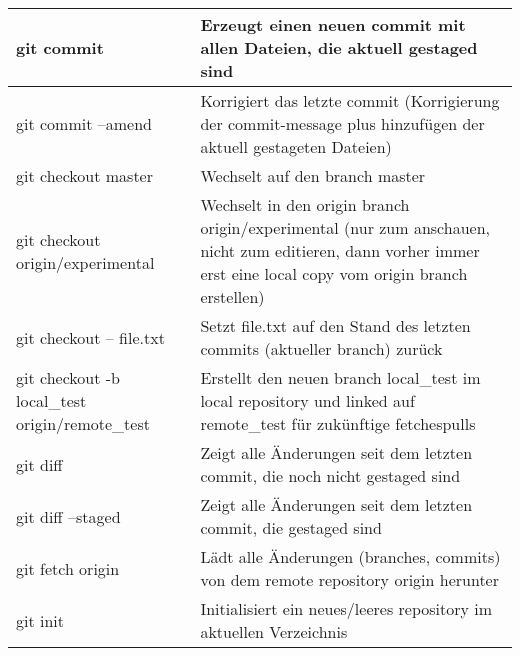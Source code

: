 \begin{longtable}{|p{7cm}|p{8cm}|}
		  	\rowcolor{tablerowcolor_orange}
		  	git commit & Erzeugt einen neuen commit mit allen Dateien, die aktuell gestaged sind
		  	\\ \hline
		  	\rowcolor{tablerowcolor_orange}
		  	git commit --amend & Korrigiert das letzte commit (Korrigierung der commit-message plus hinzufügen der aktuell gestageten Dateien)
		  	\\ \hline


		  	\rowcolor{tablerowcolor_cyan}
		  	git checkout master & Wechselt auf den branch master
		  	\\ \hline
		  	\rowcolor{tablerowcolor_cyan}
		  	git checkout origin/experimental & Wechselt in den origin branch origin/experimental (nur zum anschauen, nicht zum editieren, dann vorher immer erst eine local copy vom origin branch erstellen)
		  	\\ \hline
		  	\rowcolor{tablerowcolor_cyan}
		  	git checkout -- file.txt & Setzt file.txt auf den Stand des letzten commits (aktueller branch) zurück
		  	\\ \hline
		  	\rowcolor{tablerowcolor_cyan}
		  	git checkout -b local\_test origin/remote\_test & Erstellt den neuen branch local\_test im local repository und linked auf remote\_test für zukünftige fetches\/pulls
		  	\\ \hline


		  	\rowcolor{tablerowcolor_orange}
		  	git diff & Zeigt alle Änderungen seit dem letzten commit, die noch nicht gestaged sind
		  	\\ \hline
		  	\rowcolor{tablerowcolor_orange}
		  	git diff --staged & Zeigt alle Änderungen seit dem letzten commit, die gestaged sind
		  	\\ \hline


		  	\rowcolor{tablerowcolor_cyan}
		  	git fetch origin & Lädt alle Änderungen (branches, commits) von dem remote repository origin herunter
		  	\\ \hline


		  	\rowcolor{tablerowcolor_orange}
		  	git init & Initialisiert ein neues/leeres repository im aktuellen Verzeichnis
		  	\\ \hline



\end{longtable}
